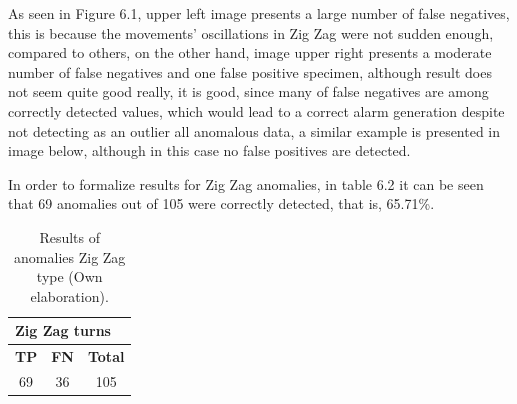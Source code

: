 As seen in Figure 6.1, upper left image presents a large number of false negatives, this is because the movements' oscillations in Zig Zag were not sudden enough, compared to others, on the other hand, image upper right presents a moderate number of false negatives and one false positive specimen, although result does not seem quite good really, it is good, since many of false negatives are among correctly detected values, which would lead to a correct alarm generation despite not detecting as an outlier all anomalous data, a similar example is presented in image below, although in this case no false positives are detected.

In order to formalize results for Zig Zag anomalies, in table 6.2 it can be seen that 69 anomalies out of 105 were correctly detected, that is, 65.71\%.

\begin{table}[H]
\centering
\begin{center}
\begin{tabular}{|c|c|c|}
\hline
\multicolumn{3}{|l|}{\textbf{Zig Zag turns}} \\ \hline
\textbf{TP}   & \textbf{FN}   & \textbf{Total}  \\ \hline
\cellcolor[HTML]{AADD99}69  & \cellcolor[HTML]{DF9F9F}36  & 105             \\ \hline
\end{tabular}
\caption{Results of anomalies Zig Zag type (Own elaboration).}
\label{table:zigzag_resultado}
\end{center}
\end{table}

